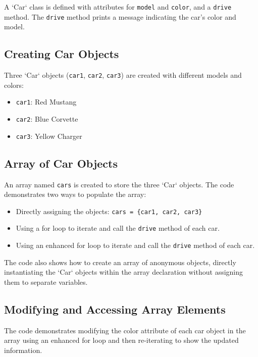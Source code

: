 \documentclass{article}
\begin{document}
A `Car` class is defined with attributes for \texttt{model} and \texttt{color}, and a \texttt{drive} method.  The \texttt{drive} method prints a message indicating the car's color and model.

\subsection{Creating Car Objects}

Three `Car` objects (\texttt{car1}, \texttt{car2}, \texttt{car3}) are created with different models and colors:

\begin{itemize}
    \item \texttt{car1}: Red Mustang
    \item \texttt{car2}: Blue Corvette
    \item \texttt{car3}: Yellow Charger
\end{itemize}

\subsection{Array of Car Objects}

An array named \texttt{cars} is created to store the three `Car` objects.  The code demonstrates two ways to populate the array:

\begin{itemize}
    \item  Directly assigning the objects: \texttt{cars = \{car1, car2, car3\}}
    \item Using a for loop to iterate and call the \texttt{drive} method of each car.
    \item Using an enhanced for loop to iterate and call the \texttt{drive} method of each car.
\end{itemize}

The code also shows how to create an array of anonymous objects, directly instantiating the `Car` objects within the array declaration without assigning them to separate variables.

\subsection{Modifying and Accessing Array Elements}

The code demonstrates modifying the color attribute of each car object in the array using an enhanced for loop and then re-iterating to show the updated information.
\end{document}
